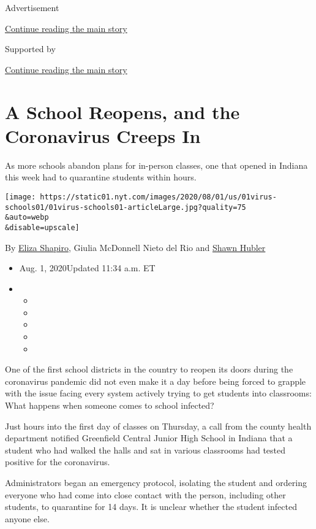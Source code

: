 Advertisement

\protect\hyperlink{after-top}{Continue reading the main story}

Supported by

\protect\hyperlink{after-sponsor}{Continue reading the main story}

\hypertarget{a-school-reopens-and-the-coronavirus-creeps-in}{%
\section{A School Reopens, and the Coronavirus Creeps
In}\label{a-school-reopens-and-the-coronavirus-creeps-in}}

As more schools abandon plans for in-person classes, one that opened in
Indiana this week had to quarantine students within hours.

\texttt{[image: https://static01.nyt.com/images/2020/08/01/us/01virus-schools01/01virus-schools01-articleLarge.jpg?quality=75\\\&auto=webp\\\&disable=upscale]}

By \href{https://www.nytimes.com/by/eliza-shapiro}{Eliza Shapiro},
Giulia McDonnell Nieto del Rio and
\href{https://www.nytimes.com/by/shawn-hubler}{Shawn Hubler}

\begin{itemize}
\item
  Aug. 1, 2020Updated 11:34 a.m. ET
\item
  \begin{itemize}
  \item
  \item
  \item
  \item
  \item
  \end{itemize}
\end{itemize}

One of the first school districts in the country to reopen its doors
during the coronavirus pandemic did not even make it a day before being
forced to grapple with the issue facing every system actively trying to
get students into classrooms: What happens when someone comes to school
infected?

Just hours into the first day of classes on Thursday, a call from the
county health department notified Greenfield Central Junior High School
in Indiana that a student who had walked the halls and sat in various
classrooms had tested positive for the coronavirus.

Administrators began an emergency protocol, isolating the student and
ordering everyone who had come into close contact with the person,
including other students, to quarantine for 14 days. It is unclear
whether the student infected anyone else.

